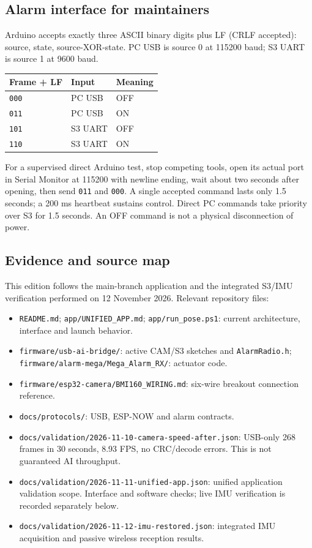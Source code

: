\documentclass[11pt,a4paper]{article}
\newcommand{\file}[1]{\nolinkurl{#1}}
\begin{document}
\subsection{Alarm interface for maintainers}
Arduino accepts exactly three ASCII binary digits plus LF (CRLF accepted): source, state, source-XOR-state. PC USB is source 0 at 115200 baud; S3 UART is source 1 at 9600 baud.
\begin{center}\begin{tabular}{lll}\toprule
Frame + LF & Input & Meaning\\\midrule
\file{000} & PC USB & OFF\\
\file{011} & PC USB & ON\\
\file{101} & S3 UART & OFF\\
\file{110} & S3 UART & ON\\\bottomrule\end{tabular}\end{center}
For a supervised direct Arduino test, stop competing tools, open its actual port in Serial Monitor at 115200 with newline ending, wait about two seconds after opening, then send \file{011} and \file{000}. A single accepted command lasts only 1.5 seconds; a 200 ms heartbeat sustains control. Direct PC commands take priority over S3 for 1.5 seconds. An OFF command is not a physical disconnection of power.
\subsection{Evidence and source map}
This edition follows the main-branch application and the integrated S3/IMU verification performed on 12 November 2026. Relevant repository files:
\begin{itemize}
\item \file{README.md}; \file{app/UNIFIED_APP.md}; \file{app/run_pose.ps1}: current architecture, interface and launch behavior.
\item \file{firmware/usb-ai-bridge/}: active CAM/S3 sketches and \file{AlarmRadio.h}; \file{firmware/alarm-mega/Mega_Alarm_RX/}: actuator code.
\item \file{firmware/esp32-camera/BMI160_WIRING.md}: six-wire breakout connection reference.
\item \file{docs/protocols/}: USB, ESP-NOW and alarm contracts.
\item \file{docs/validation/2026-11-10-camera-speed-after.json}: USB-only 268 frames in 30 seconds, 8.93 FPS, no CRC/decode errors. This is not guaranteed AI throughput.
\item \file{docs/validation/2026-11-11-unified-app.json}: unified application validation scope. Interface and software checks; live IMU verification is recorded separately below.
\item \file{docs/validation/2026-11-12-imu-restored.json}: integrated IMU acquisition and passive wireless reception results.
\end{itemize}
\end{document}
